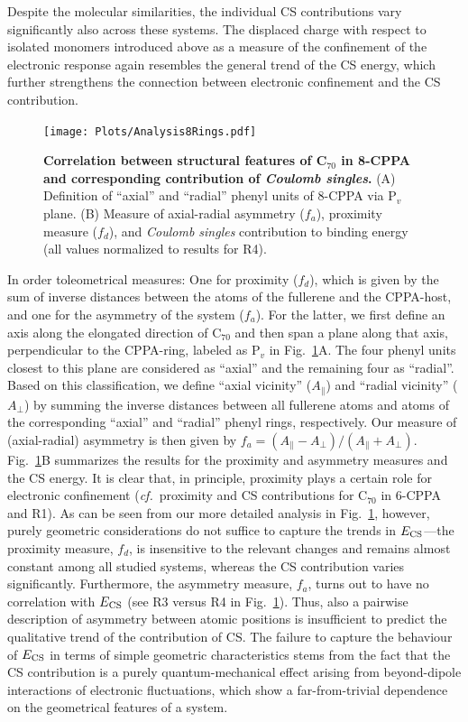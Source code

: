 \documentclass[aps,prl,groupaddress, twocolumn]{revtex4-1}  %
\begin{document}
Despite the molecular similarities, the individual CS contributions vary significantly also across these systems.
The displaced charge with respect to isolated monomers introduced above as a measure of the confinement of the electronic response again resembles the general trend of the CS energy, which further strengthens the connection between electronic confinement and the CS contribution.

\begin{figure}[htp]
\texttt{[image: Plots/Analysis8Rings.pdf]}
\caption{\textbf{Correlation between structural features of C$_{70}$ in 8-CPPA and corresponding contribution of \emph{Coulomb singles}.} (A) Definition of ``axial'' and ``radial'' phenyl units of 8-CPPA via P$_v$ plane. (B) Measure of axial-radial asymmetry ($f_a$), proximity measure ($f_d$), and \emph{Coulomb singles} contribution to binding energy (all values normalized to results for R4).}\label{fig:analysis_rings}
\end{figure}

In order toleometrical measures:
One for proximity ($f_d$), which is given by the sum of inverse distances between the atoms of the fullerene and the CPPA-host, and one for the asymmetry of the system ($f_a$).
For the latter, we first define an axis along the elongated direction of C$_{70}$ and then span a plane along that axis, perpendicular to the CPPA-ring, labeled as P$_v$ in Fig.~\ref{fig:analysis_rings}A.
The four phenyl units closest to this plane are considered as ``axial'' and the remaining four as ``radial''.
Based on this classification, we define ``axial vicinity'' ($A_{\parallel}$) and ``radial vicinity'' ($A_{\perp}$) by summing the inverse distances between all fullerene atoms and atoms of the corresponding ``axial'' and ``radial'' phenyl rings, respectively.
Our measure of (axial-radial) asymmetry is then given by $f_a = (A_{\parallel} - A_{\perp})/(A_{\parallel} + A_{\perp})$. Fig.~\ref{fig:analysis_rings}B summarizes the results for the proximity and asymmetry measures and the CS energy.
It is clear that, in principle, proximity plays a certain role for electronic confinement (\textit{cf.}\ proximity and CS contributions for C$_{70}$ in 6-CPPA and R1). As can be seen from our more detailed analysis in Fig.~\ref{fig:analysis_rings}, however, purely geometric considerations do not suffice to capture the trends in $E_{\rm CS}$---the proximity measure, $f_d$, is insensitive to the relevant changes and remains almost constant among all studied systems, whereas the CS contribution varies significantly.
Furthermore, the asymmetry measure, $f_a$, turns out to have no correlation with $E_{\rm CS}$ (see R3 versus R4 in Fig.~\ref{fig:analysis_rings}).
Thus, also a pairwise description of asymmetry between atomic positions is insufficient to predict the qualitative trend of the contribution of CS\@.
The failure to capture the behaviour of $E_{\rm CS}$ in terms of simple geometric characteristics stems from the fact that the CS contribution is a purely quantum-mechanical effect arising from beyond-dipole interactions of electronic fluctuations, which show a far-from-trivial dependence on the geometrical features of a system.
\end{document}
